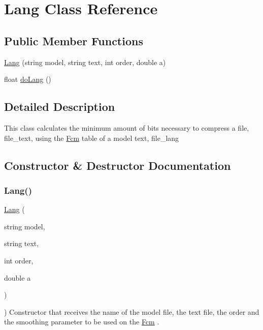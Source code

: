 \hypertarget{classLang}{}\section{Lang Class Reference}
\label{classLang}
\subsection*{Public Member Functions}
\begin{DoxyCompactItemize}
\item 
\hyperlink{classLang_a533beab39d743e2ea1d0b0f0f9140368}{Lang} (string model, string text, int order, double a)
\item 
float \hyperlink{classLang_a5961c05cbe83f588163f17367a4a99bc}{do\+Lang} ()
\end{DoxyCompactItemize}


\subsection{Detailed Description}
This class calculates the minimum amount of bits necessary to compress a file, file\+\_\+text, using the \hyperlink{classFcm}{Fcm} table of a model text, file\+\_\+lang 

\subsection{Constructor \& Destructor Documentation}
\mbox{\label{classLang_a533beab39d743e2ea1d0b0f0f9140368}} 
\subsubsection{\texorpdfstring{Lang()}{Lang()}}
{\footnotesize\ttfamily \hyperlink{classLang}{Lang} (\begin{DoxyParamCaption}\item[{string}]{model,  }\item[{string}]{text,  }\item[{int}]{order,  }\item[{double}]{a }\end{DoxyParamCaption})\hspace{0.3cm}{\ttfamily [inline]}}

) Constructor that receives the name of the model file, the text file, the order and the smoothing parameter to be used on the \hyperlink{classFcm}{Fcm} . 

